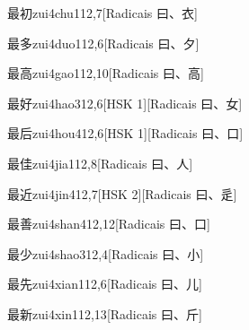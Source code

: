 \begin{entry}{最初}{zui4chu1}{12,7}[Radicais ⽈、⾐]
\end{entry}

\begin{entry}{最多}{zui4duo1}{12,6}[Radicais ⽈、⼣]
\end{entry}

\begin{entry}{最高}{zui4gao1}{12,10}[Radicais ⽈、⾼]
\end{entry}

\begin{entry}{最好}{zui4hao3}{12,6}[HSK 1][Radicais ⽈、⼥]
\end{entry}

\begin{entry}{最后}{zui4hou4}{12,6}[HSK 1][Radicais ⽈、⼝]
\end{entry}

\begin{entry}{最佳}{zui4jia1}{12,8}[Radicais ⽈、⼈]
\end{entry}

\begin{entry}{最近}{zui4jin4}{12,7}[HSK 2][Radicais ⽈、⾡]
\end{entry}

\begin{entry}{最善}{zui4shan4}{12,12}[Radicais ⽈、⼝]
\end{entry}

\begin{entry}{最少}{zui4shao3}{12,4}[Radicais ⽈、⼩]
\end{entry}

\begin{entry}{最先}{zui4xian1}{12,6}[Radicais ⽈、⼉]
\end{entry}

\begin{entry}{最新}{zui4xin1}{12,13}[Radicais ⽈、⽄]
\end{entry}

